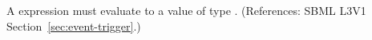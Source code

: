 A \Trigger expression must evaluate to a value of type .
(References: SBML L3V1 Section~\ref{sec:event-trigger}.)
